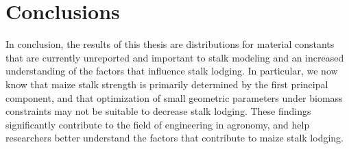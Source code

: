 \section{Conclusions}
\label{sec:conclusions}
In conclusion, the results of this thesis are distributions for material constants that are currently unreported and important to stalk modeling and an increased understanding of the factors that influence stalk lodging. In particular, we now know that maize stalk strength is primarily determined by the first principal component, and that optimization of small geometric parameters under biomass constraints may not be suitable to decrease stalk lodging. These findings significantly contribute to the field of engineering in agronomy, and help researchers better understand the factors that contribute to maize stalk lodging.